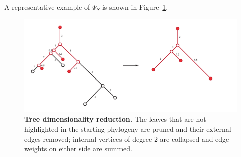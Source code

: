 \documentclass[a4paper,11pt]{article}
\begin{document}
A representative example of $\Psi_S$ is shown in Figure~\ref{fig:dimred_tree-dim-red}.
\begin{figure}
    \centering
    \includegraphics[width=6in]{../figures/dimred_tree-dim-red.pdf}
    \caption{{\bf Tree dimensionality reduction.} The leaves that are not highlighted in the starting phylogeny are pruned and their external edges removed; internal vertices of degree $2$ are collapsed and edge weights on either side are summed.}
    \label{fig:dimred_tree-dim-red}
\end{figure} 

\end{document}
